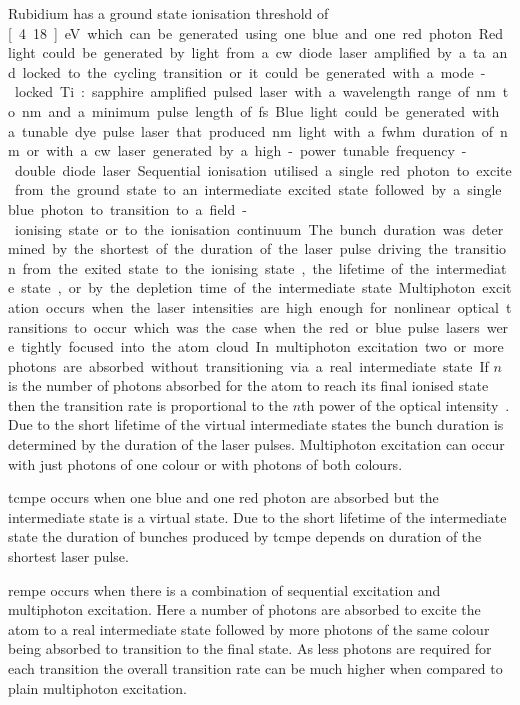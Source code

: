 Rubidium has a ground state ionisation threshold of \unit[4.18]{eV} which can be generated using one blue and one red photon.
Red light could be generated by light from a \gls{cw} diode laser amplified by a \gls{ta} and locked to the cycling transition or it could be generated with a mode-locked Ti:sapphire amplified pulsed laser with a wavelength range of \unit[770]{nm} to \unit[830]{nm} and a minimum pulse length of \unit[35]{fs}.
Blue light could be generated with a tunable dye pulse laser that produced \unit[460 to 490]{nm} light with a \gls{fwhm} duration of \unit[5]{nm} or with a \gls{cw} laser generated by a high-power tunable frequency-double diode laser.

Sequential ionisation utilised a single red photon to excite from the ground state to an intermediate excited state followed by a single blue photon to transition to a field-ionising state or to the ionisation continuum.
The bunch duration was determined by the shortest of the duration of the laser pulse driving the transition from the exited state to the ionising state, the lifetime of the intermediate state, or by the depletion time of the intermediate state.

Multiphoton excitation occurs when the laser intensities are high enough for nonlinear optical transitions to occur which was the case when the red or blue pulse lasers were tightly focused into the atom cloud.
In multiphoton excitation two or more photons are absorbed without transitioning via a real intermediate state.
If $n$ is the number of photons absorbed for the atom to reach its final ionised state then the transition rate is proportional to the $n$th power of the optical intensity~\cite{joachain_atoms_2011}.
Due to the short lifetime of the virtual intermediate states the bunch duration is determined by the duration of the laser pulses.
Multiphoton excitation can occur with just photons of one colour or with photons of both colours.

\Gls{tcmpe} occurs when one blue and one red photon are absorbed but the intermediate state is a virtual state.
Due to the short lifetime of the intermediate state the duration of bunches produced by \gls{tcmpe} depends on duration of the shortest laser pulse.

\Gls{rempe} occurs when there is a combination of sequential excitation and multiphoton excitation.
Here a number of photons are absorbed to excite the atom to a real intermediate state followed by more photons of the same colour being absorbed to transition to the final state.
As less photons are required for each transition the overall transition rate can be much higher when compared to plain multiphoton excitation.

